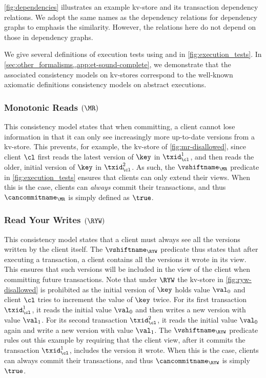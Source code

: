 \noindent \cref{fig:dependencies} illustrates an example kv-store and
its transaction dependency relations.
We adopt the same names as the dependency relations for dependency graphs \citep{adya}
to emphasis the similarity.
However, the relations here do not depend on those in dependency graphs.

We give several definitions of
execution tests using \vshiftname and \cancommitname in \cref{fig:execution_tests}. 
In \cref{sec:other_formalisms,,app:et-sound-complete}, 
we demonstrate that the associated consistency models on kv-stores correspond to 
the well-known axiomatic definitions consistency models on abstract executions.


\subsubsection{Monotonic Reads \((\MR)\)}
This consistency model states that when committing, a client
cannot lose information in that it can only see increasingly more up-to-date versions from a kv-store.
This prevents, for example, the kv-store of \cref{fig:mr-disallowed},
since client \(\cl\) first reads the latest version of \(\key\) in \(\txid_{\cl}^{1}\), 
and then reads the older, initial version of \(\key\) in \(\txid_{\cl}^{2}\).  
As such, the \(\vshiftname_{\MR}\) predicate in \cref{fig:execution_tests} ensures that clients  can only extend their views. 
When this is the case, clients can \emph{always} commit their transactions, and thus \(\cancommitname_{\MR}\) is simply defined as \(\true\). 

\subsubsection{Read Your Writes \((\RYW)\)}
This consistency model states that a client must always see all the versions written by the client itself. 
The \(\vshiftname_{\RYW}\) predicate thus states that after executing a transaction, a client 
contains all the versions it wrote in its view. This ensures that such versions will be included in the view of the client 
when committing future transactions.
Note that under \(\RYW\) the kv-store in \cref{fig:ryw-disallowed} is prohibited as
the initial version of \(\key\) holds value \(\val_0\) 
and client \(\cl\) tries to increment the value of \(\key\) twice.  
For its first transaction \( \txid_{\cl}^1\), it reads the initial value \(\val_0\) and then writes a new version with value \(\val_1\). 
For its second transaction \( \txid_{\cl}^2\), it reads the initial value \(\val_0\) again and write a new version with value \(\val_1\).
The \(\vshiftname_{\RYW}\) predicate rules out this example by requiring that
the client view, after it commits the transaction  \(\txid_{\cl}^{1}\), includes the version it wrote.  
When this is the case, clients can always commit their transactions, and thus \(\cancommitname_{\RYW}\) is simply \(\true\).

